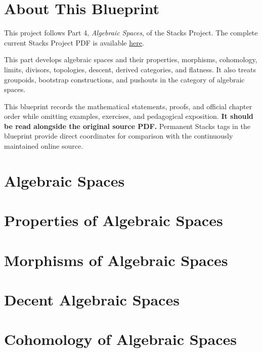

\chapter*{About This Blueprint}

This project follows Part 4, \emph{Algebraic Spaces}, of the Stacks Project.
The complete current Stacks Project PDF is available
\href{https://stacks.math.columbia.edu/download/book.pdf}{here}.

This part develops algebraic spaces and their properties, morphisms,
cohomology, limits, divisors, topologies, descent, derived categories, and
flatness. It also treats groupoids, bootstrap constructions, and pushouts in
the category of algebraic spaces.

This blueprint records the mathematical statements, proofs, and official
chapter order while omitting examples, exercises, and pedagogical exposition.
\textbf{It should be read alongside the original source PDF.} Permanent Stacks
tags in the blueprint provide direct coordinates for comparison with the
continuously maintained online source.

\chapter{Algebraic Spaces}
\label{chap:spaces}


\chapter{Properties of Algebraic Spaces}
\label{chap:spaces-properties}


\chapter{Morphisms of Algebraic Spaces}
\label{chap:spaces-morphisms}


\chapter{Decent Algebraic Spaces}
\label{chap:decent-spaces}


\chapter{Cohomology of Algebraic Spaces}
\label{chap:spaces-cohomology}


